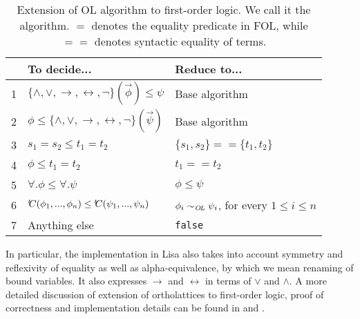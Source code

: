 \begin{table}[ht]
  \centering
  \begin{tabular}{c | l | l}
      & To decide...                                                                             & Reduce to...                                           \\
    \hline
    1 & $\lbrace \land, \lor, \rightarrow, \leftrightarrow, \neg \rbrace(\vec{\phi}) \leq \psi $ & Base algorithm                                         \\
    2 & $\phi \leq \lbrace \land, \lor, \rightarrow, \leftrightarrow, \neg \rbrace(\vec{\psi}) $ & Base algorithm                                         \\
    3 & $s_1 = s_2 \leq t_1 = t_2$                                                               & $\lbrace s_1, s_2 \rbrace == \lbrace t_1, t_2 \rbrace$ \\
    4 & $\phi \leq t_1 = t_2$                                                                    & $t_1 == t_2$                                           \\
    5 & $\forall. \phi \leq \forall. \psi$                                                       & $\phi \leq \psi$                                       \\
    6 & ${'\hspace{-0.2em}C}(\phi_1,...,\phi_n) \leq {'\hspace{-0.2em}C}(\psi_1,...,\psi_n)$                         & $\phi_i \sim_{\mathit{O{\kern-0.1em}L}} \psi_i$, for every $1 \le i \le n$    \\

    7 & Anything else                                                                            & \lstinline|false|
  \end{tabular}

  \caption{Extension of OL algorithm to first-order logic. We call it the \FOLalg{} algorithm. $=$ denotes the equality predicate in FOL, while $==$ denotes syntactic equality of terms.
    \label{tab:Olextension}}
\end{table}


In particular, the implementation in Lisa also takes into account symmetry and reflexivity of equality as well as alpha-equivalence, by which we mean renaming of bound variables. It also expresses $\rightarrow$ and $\leftrightarrow$ in terms of $\lor$ and $\land$.
A more detailed discussion of extension of ortholattices to first-order logic, proof of correctness and implementation details can be found in \cite{guilloudFormulaNormalizationsVerification2023} and \cite{guilloudLisaModernProof2023}.




